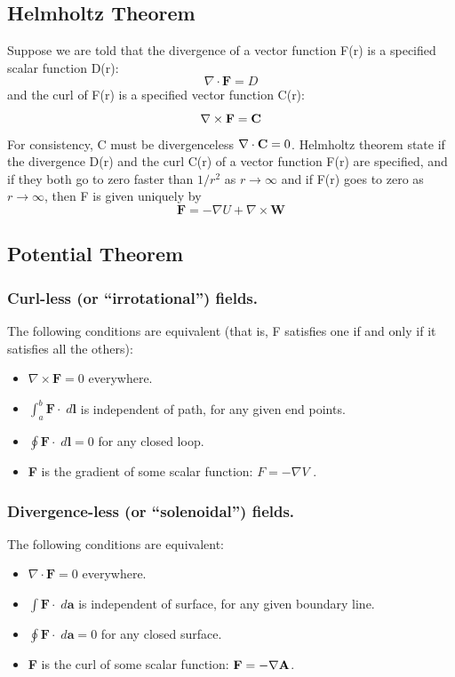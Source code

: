 \documentclass[../../../main.tex]{subfiles}
\begin{document}
\subsection{Helmholtz Theorem}
Suppose we are told that the divergence of a vector function F(r) is a specified
scalar function D(r):
\begin{equation*}
    \nabla \cdot \mathbf{F}=D
\end{equation*}
and the curl of F(r) is a speciﬁed vector function C(r):
\begin{equation*}
    \nabla \times \mathbf{F}=\mathbf{C}
\end{equation*}
For consistency, C must be divergenceless $\nabla \cdot \mathbf{C}=0$.
Helmholtz theorem state if the divergence D(r) and the curl C(r)
of a vector function F(r) are speciﬁed,
and if they both go to zero faster than $1/r^2$ as $ r \rightarrow \infty$
and if F(r)
goes to zero as $ r \rightarrow \infty$,
then F is given uniquely by
\begin{equation*}
    \mathbf{F} =-\nabla U+\nabla \times \mathbf{W}
\end{equation*}

\subsection{Potential Theorem}
\subsubsection{Curl-less (or “irrotational”) fields.}
The following conditions are equivalent
(that is, F satisﬁes one if and only if it satisﬁes all the others):
\begin{itemize}
    \item $\nabla \times \mathbf{F}=0$ everywhere.
    \item  $\int_{a}^{b}\mathbf{F}\cdot\;d\mathbf{l}$ is independent of path, for any given end points.
    \item $\oint\mathbf{F} \cdot\;d\mathbf{l}=0$ for any closed loop.
    \item \textbf{F} is the gradient of some scalar function: $F =- \nabla V$ .
\end{itemize}

\subsubsection{Divergence-less (or “solenoidal”) fields.}
The following conditions are equivalent:
\begin{itemize}
    \item $\nabla \cdot \mathbf{F}=0$ everywhere.
    \item  $\int\mathbf{F}\cdot\;d\mathbf{a}$ is independent of surface, for any given boundary line.
    \item $\oint\mathbf{F} \cdot\;d\mathbf{a}=0$ for any closed surface.
    \item \textbf{F} is the curl  of some scalar function: $\mathbf{F} =- \nabla \mathbf{A}$.
\end{itemize}
\end{document}
